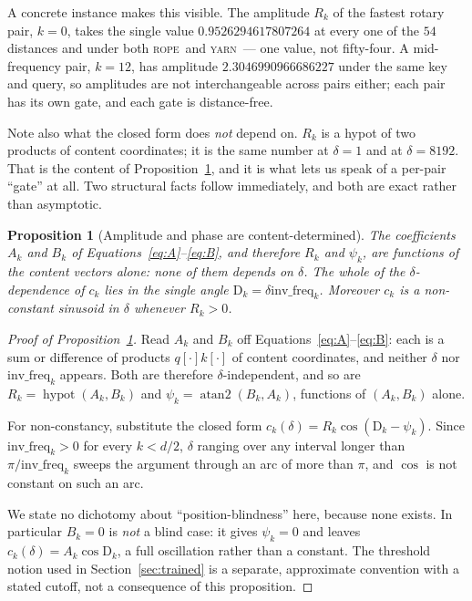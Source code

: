 \documentclass{article}
\theoremstyle{plain}
\newtheorem{proposition}[theorem]{Proposition}
\theoremstyle{remark}
\newcommand{\rope}{\textsc{rope}}
\newcommand{\yarn}{\textsc{yarn}}
\newcommand{\invf}{\mathrm{inv\_freq}}
\newcommand{\D}{\mathrm{D}_k}
\newcommand{\Ak}{A_k}
\newcommand{\Bk}{B_k}
\newcommand{\Rk}{R_k}
\newcommand{\psik}{\psi_k}
\newcommand{\half}{d/2}
\begin{document}
A concrete instance makes this visible. The amplitude $\Rk$ of the fastest rotary
pair, $k = 0$, takes the single value $0.9526294617807264$ at every one of the
$54$ distances and under both \rope\ and \yarn\ --- one value, not fifty-four. A
mid-frequency pair, $k = 12$, has amplitude $2.3046990966686227$ under the same
key and query, so amplitudes are not interchangeable across pairs either; each
pair has its own gate, and each gate is distance-free.

Note also what the closed form does \emph{not} depend on. $\Rk$ is a
hypot of two products of content coordinates; it is the same number at
$\delta = 1$ and at $\delta = 8192$. That is the content of
Proposition~\ref{prop:blind}, and it is what lets us speak of a per-pair
``gate'' at all. Two structural facts follow immediately, and both are exact
rather than asymptotic.

\begin{proposition}[Amplitude and phase are content-determined]
\label{prop:blind}
The coefficients $\Ak$ and $\Bk$ of Equations~\ref{eq:A}--\ref{eq:B}, and
therefore $\Rk$ and $\psik$, are functions of the content vectors alone: none of
them depends on $\delta$. The whole of the $\delta$-dependence of $c_k$ lies in the
single angle $\D = \delta\invf_k$. Moreover $c_k$ is a \emph{non-constant}
sinusoid in $\delta$ whenever $\Rk > 0$.
\end{proposition}

\begin{proof}[Proof of Proposition~\ref{prop:blind}]
Read $\Ak$ and $\Bk$ off Equations~\ref{eq:A}--\ref{eq:B}: each is a sum or
difference of products $q[\cdot]k[\cdot]$ of content coordinates, and neither
$\delta$ nor $\invf_k$ appears. Both are therefore $\delta$-independent, and so
are $\Rk = \operatorname{hypot}(\Ak, \Bk)$ and
$\psik = \operatorname{atan2}(\Bk, \Ak)$, functions of $(\Ak, \Bk)$ alone.

For non-constancy, substitute the closed form $c_k(\delta) = \Rk\cos(\D - \psik)$.
Since $\invf_k > 0$ for every $k < \half$, $\delta$ ranging over any interval
longer than $\pi/\invf_k$ sweeps the argument through an arc of more than $\pi$,
and $\cos$ is not constant on such an arc.

We state no dichotomy about ``position-blindness'' here, because none exists.
In particular $\Bk = 0$ is \emph{not} a blind case: it gives $\psik = 0$ and
leaves $c_k(\delta) = \Ak\cos\D$, a full oscillation rather than a constant.
The threshold notion used in Section~\ref{sec:trained} is a separate,
approximate convention with a stated cutoff, not a consequence of this
proposition.
\end{proof}
\end{document}
